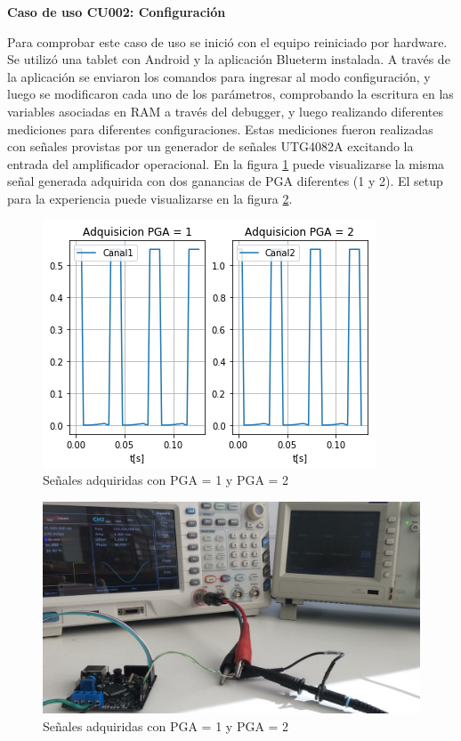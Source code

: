 \textbf{Caso de uso CU002: Configuración}

Para comprobar este caso de uso se inició con el equipo reiniciado por hardware. Se utilizó una tablet con Android y la aplicación Blueterm instalada. A través de la aplicación se enviaron los comandos para ingresar al modo configuración, y luego se modificaron cada uno de los parámetros, comprobando la escritura en las variables asociadas en RAM a través del debugger, y luego realizando diferentes mediciones para diferentes configuraciones. Estas mediciones fueron realizadas con señales provistas por un generador de señales UTG4082A excitando la entrada del amplificador operacional. En la figura \ref{fig:confPGA} puede visualizarse la misma señal generada adquirida con dos ganancias de PGA diferentes (1 y 2). El setup para la experiencia puede visualizarse en la figura \ref{fig:confPGAexp}.

\begin{figure} [!htpb]
    \centering
    \includegraphics[width=\textwidth]{./Figures/confPGA.png}
    \caption{Señales adquiridas con PGA = 1 y PGA = 2}
    \label{fig:confPGA}
\end{figure}

\begin{figure} [!htpb]
    \centering
    \includegraphics[width=\textwidth]{Figures/confPGAexp.jpeg}
    \caption{Señales adquiridas con PGA = 1 y PGA = 2}
    \label{fig:confPGAexp}
\end{figure}

